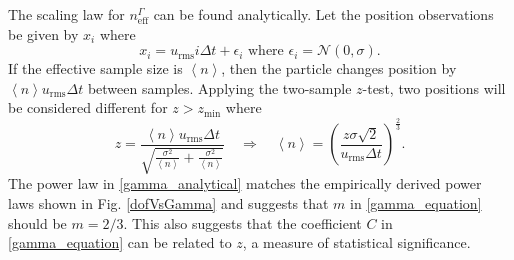 \documentclass{ametsoc}
\begin{document}
The scaling law for $n_{\textrm{eff}}^\Gamma$ can be found analytically.
Let the position observations be given by $x_i$ where
\begin{equation}
x_i = u_\textrm{rms} i \Delta t + \epsilon_i \textrm{ where } \epsilon_i = \mathcal{N}(0,\sigma).
\end{equation}
If the effective sample size is $\left\langle n \right\rangle$, then the particle changes position by $\left\langle n \right\rangle u_\textrm{rms} \Delta t$ between samples. Applying the two-sample $z$-test, two positions will be considered different for $z>z_\textrm{min}$ where
\begin{equation}
z= \frac{\left\langle n \right\rangle u_\textrm{rms} \Delta t}{\sqrt{\frac{\sigma^2}{\left\langle n \right\rangle} + \frac{\sigma^2}{\left\langle n \right\rangle} }} \quad
\Rightarrow \quad
\label{gamma_analytical}
\left\langle n \right\rangle = \left( \frac{z \sigma \sqrt{2}}{u_\textrm{rms} \Delta t} \right)^{\frac{2}{3}}.
\end{equation}
The power law in \eqref{gamma_analytical} matches the empirically derived power laws shown in Fig. \ref{dofVsGamma} and suggests that $m$ in \eqref{gamma_equation} should be $m=2/3$. This also suggests that the coefficient $C$ in \eqref{gamma_equation} can be related to $z$, a measure of statistical significance.
\end{document}
